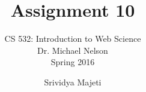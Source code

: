 \documentclass[envcountsame,envcountchap]{svmono}
\begin{document}
\author{Srividya Majeti}
\title{Assignment 10}

\subtitle{CS 532:  Introduction to Web Science\\Dr. Michael Nelson\\Spring 2016}

\maketitle

\frontmatter

\tableofcontents

\mainmatter




%
%

\backmatter
 		
\nocite{*}  					
\small  					


\end{document}

